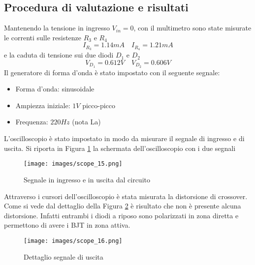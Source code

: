 \subsection{Procedura di valutazione e risultati}
Mantenendo la tensione in ingresso $V_{in}=0$, con il multimetro sono state misurate le correnti sulle resistenze $R_3$ e $R_4$
\begin{equation*}
    I_{R_3}=1.14mA\quad I_{R_4}=1.21mA
\end{equation*}
e la caduta di tensione sui due diodi $D_1$ e $D_2$
\begin{equation*}
    V_{D_1}=0.612V\quad V_{D_2}=0.606V
\end{equation*}
\clearpage 
Il generatore di forma d'onda è stato impostato con il seguente segnale:
\begin{itemize}
    \item Forma d'onda: sinusoidale
    \item Ampiezza iniziale: $1V$ picco-picco
    \item Frequenza: $220Hz$ (nota La)
\end{itemize}
L'oscilloscopio è stato impostato in modo da misurare il segnale di ingresso e di uscita. Si riporta in Figura \ref{fig:scope_15} la schermata dell'oscilloscopio con i due segnali
\begin{figure}[H]
    \centering
    \texttt{[image: images/scope\_15.png]}
    \caption{Segnale in ingresso e in uscita dal circuito}
    \label{fig:scope_15}
\end{figure}
Attraverso i cursori dell'oscilloscopio è stata misurata la distorsione di crossover. Come si vede dal dettaglio della Figura \ref{fig:scope_16} è risultato che non è presente alcuna distorsione. Infatti entrambi i diodi a riposo sono polarizzati in zona diretta e permettono di avere i BJT in zona attiva.
\begin{figure}[H]
    \centering
    \texttt{[image: images/scope\_16.png]}
    \caption{Dettaglio segnale di uscita}
    \label{fig:scope_16}
\end{figure}
